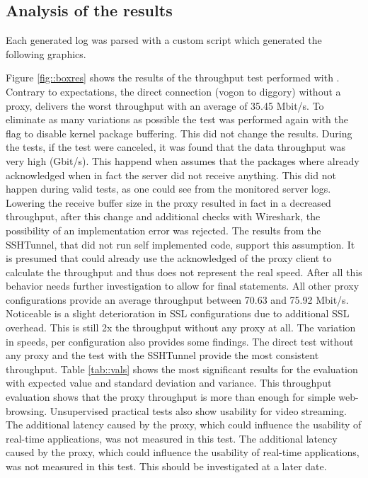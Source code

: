 \documentclass[12pt, a4paper]{scrartcl}
\begin{document}
\subsection{Analysis of the results}
Each generated log was parsed with a custom script which generated the following graphics.

\noindent Figure \@\ref{fig::boxres} shows the results of the throughput test performed with . Contrary to expectations, the direct connection (vogon to diggory) without a proxy, delivers the worst throughput with an average of 35.45 Mbit/s. To eliminate as many variations as possible the test was performed again with the    flag to disable kernel package buffering. This did not change the results.\newline
During the tests, if the test were canceled, it was found that the data throughput was very high (Gbit/s). This happend when  assumes that the packages where already acknowledged when in fact the server did not receive anything. This did not happen during valid tests, as one could see from the monitored server logs. Lowering the receive buffer size in the proxy resulted in fact in a decreased throughput, after this change and additional checks with Wireshark, the possibility of an implementation error was rejected. The results from the SSHTunnel, that did not run self implemented code, support this assumption. It is presumed that  could already use the acknowledged of the proxy client to calculate the throughput and thus does not represent the real speed. After all this behavior needs further investigation to allow for final statements.\newline
All other proxy configurations provide an average throughput between 70.63 and 75.92 Mbit/s. Noticeable is a slight deterioration in \ac{SSL} configurations due to additional \ac{SSL} overhead. This is still 2x the throughput without any proxy at all. The variation in speeds, per configuration also provides some findings. The direct test without any proxy and the test with the SSHTunnel provide the most consistent throughput. Table \ref{tab::vals} shows the most significant results for the evaluation with expected value and standard deviation and variance.\newline
This throughput evaluation shows that the proxy throughput is more than enough for simple web-browsing. Unsupervised practical tests also show usability for video streaming. The additional latency caused by the proxy, which could influence the usability of real-time applications, was not measured in this test. The additional latency caused by the proxy, which could influence the usability of real-time applications, was not measured in this test. This should be investigated at a later date.
\end{document}
